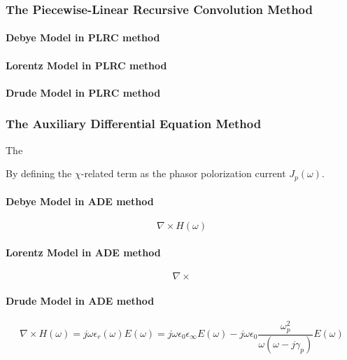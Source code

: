 \subsubsection{The Piecewise-Linear Recursive Convolution Method}
\paragraph{Debye Model in PLRC method}

\paragraph{Lorentz Model in PLRC method}

\paragraph{Drude Model in PLRC method}

\subsubsection{The Auxiliary Differential Equation Method}
The 

By defining the $\chi$-related term as the phasor polorization current $J_p(\omega)$.
\paragraph{Debye Model in ADE method}
\begin{displaymath}
  \nabla \times H(\omega)
\end{displaymath}

\paragraph{Lorentz Model in ADE method}
\begin{displaymath}
  \nabla \times
\end{displaymath}

\paragraph{Drude Model in ADE method}
\begin{displaymath}
    \nabla \times H(\omega) = j\omega \epsilon_r(\omega)E(\omega) = j\omega\epsilon_0 \epsilon_{\infty} E(\omega) - j\omega\epsilon_0\frac{\omega_p^2}{\omega(\omega-j\gamma_p)}E(\omega)
\end{displaymath}

